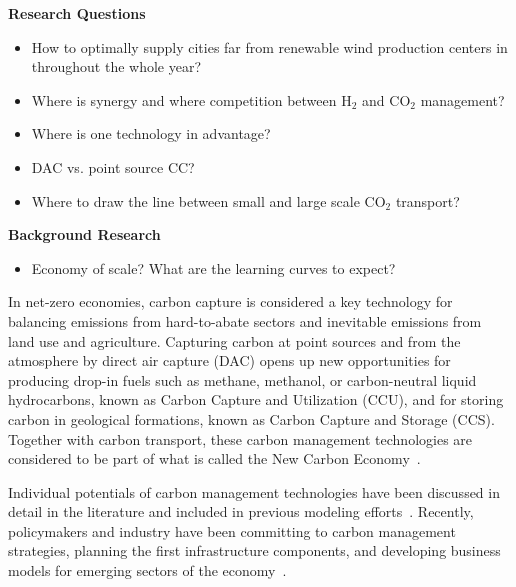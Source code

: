 \textbf{Research Questions}

\begin{itemize}
    \item How to optimally supply cities far from renewable wind production centers in throughout the whole year?
    \item Where is synergy and where competition between H$_2$ and CO$_2$ management?
    \item Where is one technology in advantage?
    \item DAC vs. point source CC?
    \item Where to draw the line between small and large scale CO$_2$ transport?
\end{itemize}


\textbf{Background Research}

\begin{itemize}
    \item Economy of scale? What are the learning curves to expect?
\end{itemize}


In net-zero economies, carbon capture is considered a key technology for balancing emissions from hard-to-abate sectors and inevitable emissions from land use and agriculture. Capturing carbon at point sources and from the atmosphere by direct air capture (DAC) opens up new opportunities for producing drop-in fuels such as methane, methanol, or carbon-neutral liquid hydrocarbons, known as Carbon Capture and Utilization (CCU), and for storing carbon in geological formations, known as Carbon Capture and Storage (CCS). Together with carbon transport, these carbon management technologies are considered to be part of what is called the New Carbon Economy~\cite{arniehellerNewCarbonEconomy2019}.

Individual potentials of carbon management technologies have been discussed in detail in the literature and included in previous modeling efforts~\cite{burandtDecarbonizingChinaEnergy2019,caprosEnergysystemModellingEU2019,damoreOptimalDesignEuropean2021,larsonNetZeroAmericaPotential2021,maModelingOptimizationCombined2021,mikulcicFlexibleCarbonCapture2019,williamsCarbonNeutralPathwaysUnited2021}. Recently, policymakers and industry have been committing to carbon management strategies, planning the first infrastructure components, and developing business models for emerging sectors of the economy~\cite{adomaitisEquinorRWEBuild2023,apnewswireGermanyDrawLegislation2023,KohlenstoffKannKlimaschutz2023,OGETESJoin2022,TESHydrogenLife2023}.

